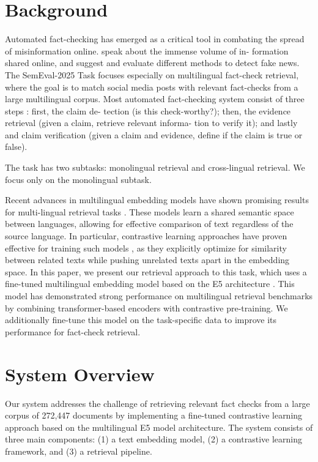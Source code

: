 \documentclass[11pt]{article}
\begin{document}
\section{Background}

Automated fact-checking has emerged as a critical tool in combating the spread of misinformation online. \cite{zhou2020fakenews} speak about the immense volume of in-
formation shared online, and suggest and evaluate different methods to detect fake news. The SemEval-2025 Task \cite{semeval2025task7} focuses especially on multilingual fact-check retrieval, where the goal is to match social media posts with relevant fact-checks from a large multilingual corpus.
Most automated fact-checking system consist of
three steps \cite{guo2022survey}: first, the claim de-
tection (is this check-worthy?); then, the evidence
retrieval (given a claim, retrieve relevant informa-
tion to verify it); and lastly and claim verification
(given a claim and evidence, define if the claim
is true or false). 

The task \cite{semeval2025task7}  has two subtasks: monolingual retrieval and cross-lingual retrieval. We focus only on the monolingual subtask. 

Recent advances in multilingual embedding models have shown promising results for multi-lingual retrieval tasks \cite{feng2022languageagnosticbertsentenceembedding, litschko2022crosslingual}. These models learn a shared semantic space between languages, allowing for effective comparison of text regardless of the source language. In particular, contrastive learning approaches have proven effective for training such models \cite{chen2020simple}, as they explicitly optimize for similarity between related texts while pushing unrelated texts apart in the embedding space.
In this paper, we present our retrieval approach to
this task, which uses a fine-tuned multilingual
embedding model based on the E5 architecture \cite{wang2024multilingual}. This model has demonstrated strong performance on multilingual retrieval benchmarks \cite{zhang2021mrtydimultilingualbenchmark} by combining transformer-based encoders with contrastive pre-training. We additionally fine-tune this model on the task-specific data to improve its performance for fact-check retrieval.
\section{System Overview}

Our system addresses the challenge of retrieving relevant fact checks from a large corpus of 272,447 documents by implementing a fine-tuned contrastive learning approach based on the multilingual E5 model architecture. The system consists of three main components: (1) a text embedding model, (2) a contrastive learning framework, and (3) a retrieval pipeline.
\end{document}
